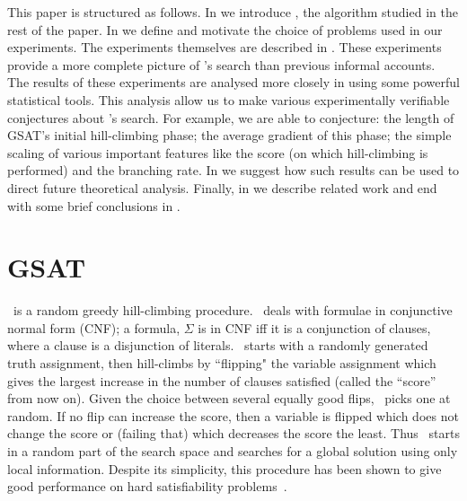 This paper is structured as follows. In 
we introduce \GSAT, the algorithm studied in
the rest of the paper. In 
we define and motivate the choice of problems used in
our experiments. The experiments themselves
are described in .
These experiments provide a more complete picture of
\GSAT's search than previous informal accounts.
The results of these experiments are 
analysed more closely in 
using some powerful statistical tools. This
analysis allow us to make various experimentally
verifiable conjectures
about \GSAT's search. For example, we are able to
conjecture: the length of GSAT's initial hill-climbing phase;
the average gradient of this phase; the simple scaling of
various important features like the score (on which hill-climbing
is performed) and the branching rate.
In  we suggest how such results can
be used to direct future theoretical analysis. Finally,
in  we describe related work and 
end with some brief conclusions in .


\section{GSAT}
\label{sec-gsat}

\GSAT\ is a random greedy hill-climbing procedure.
\GSAT\ deals with formulae in conjunctive normal form
(CNF); a formula, $\Sigma$ is in CNF iff it is a conjunction of clauses,
where a clause is a disjunction of literals.
\GSAT\ starts with a randomly generated truth assignment, then
hill-climbs by ``flipping" the variable assignment 
which gives the largest increase in the number of clauses 
satisfied (called
the ``score'' from now on). Given the choice between several
equally good flips, \GSAT\ picks one at random. 
If no flip can increase the score, then a variable is flipped which does 
not change the score or (failing that) 
which decreases the score the least.
Thus \GSAT\ starts in a random part of the search space
and searches for a global solution using only local information.
Despite its simplicity, this procedure has been shown to give
good performance on hard satisfiability problems~\cite{selman-gsat}.

